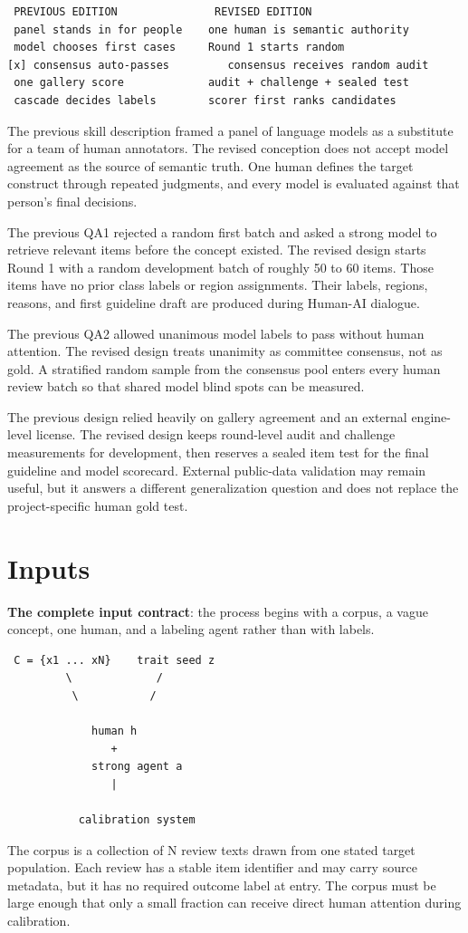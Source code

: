 \begin{verbatim}
 PREVIOUS EDITION               REVISED EDITION
 panel stands in for people    one human is semantic authority
 model chooses first cases     Round 1 starts random
[x] consensus auto-passes         consensus receives random audit
 one gallery score             audit + challenge + sealed test
 cascade decides labels        scorer first ranks candidates
\end{verbatim}
The previous skill description framed a panel of language models as a substitute for a team of human annotators. The revised conception does not accept model agreement as the source of semantic truth. One human defines the target construct through repeated judgments, and every model is evaluated against that person's final decisions.

The previous QA1 rejected a random first batch and asked a strong model to retrieve relevant items before the concept existed. The revised design starts Round 1 with a random development batch of roughly 50 to 60 items. Those items have no prior class labels or region assignments. Their labels, regions, reasons, and first guideline draft are produced during Human-AI dialogue.

The previous QA2 allowed unanimous model labels to pass without human attention. The revised design treats unanimity as committee consensus, not as gold. A stratified random sample from the consensus pool enters every human review batch so that shared model blind spots can be measured.

The previous design relied heavily on gallery agreement and an external engine-level license. The revised design keeps round-level audit and challenge measurements for development, then reserves a sealed item test for the final guideline and model scorecard. External public-data validation may remain useful, but it answers a different generalization question and does not replace the project-specific human gold test.


\section{Inputs}
\textbf{The complete input contract}: the process begins with a corpus, a vague concept, one human, and a labeling agent rather than with labels.

\begin{verbatim}
 C = {x1 ... xN}    trait seed z
         \             /
          \           /

             human h
                +
             strong agent a
                |

           calibration system
\end{verbatim}
The corpus is a collection of N review texts drawn from one stated target population. Each review has a stable item identifier and may carry source metadata, but it has no required outcome label at entry. The corpus must be large enough that only a small fraction can receive direct human attention during calibration.


